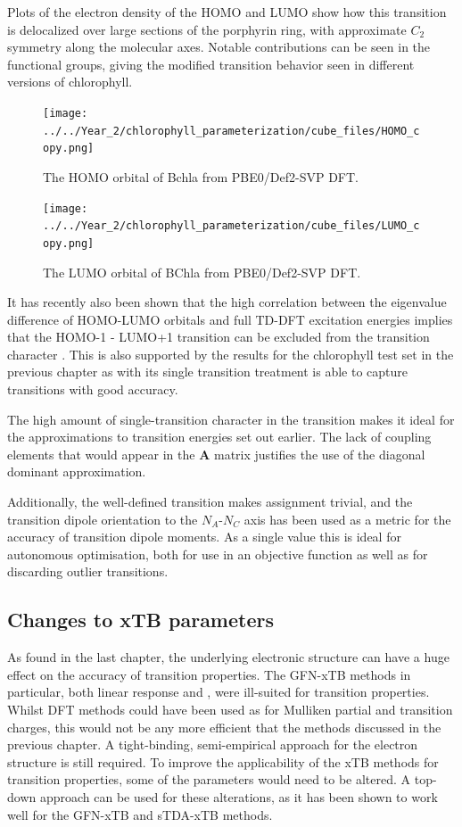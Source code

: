 Plots of the electron density of the HOMO and LUMO show how this transition is delocalized
over large sections of the porphyrin ring, with approximate $C_2$ symmetry along
the molecular axes. Notable contributions can be seen in the functional groups,
giving the modified transition behavior seen in different versions of chlorophyll.

\begin{figure}
    \centering
    \texttt{[image: ../../Year\_2/chlorophyll\_parameterization/cube\_files/HOMO\_copy.png]}
    \caption{The HOMO orbital of Bchla from PBE0/Def2-SVP DFT.}
    \label{fig:HOMO}
\end{figure}

\begin{figure}
    \centering
    \texttt{[image: ../../Year\_2/chlorophyll\_parameterization/cube\_files/LUMO\_copy.png]}
    \caption{The LUMO orbital of BChla from PBE0/Def2-SVP DFT.}
\end{figure}

It has recently also been shown that the high correlation between the eigenvalue
difference of HOMO-LUMO orbitals and full TD-DFT excitation energies implies that
the HOMO-1 - LUMO+1 transition can be excluded from the transition character \cite{Saito2020}.
This is also supported by the results for the chlorophyll test set in the previous
chapter as \dscf with its single transition treatment is able to capture \Qy transitions
with good accuracy.

The high amount of single-transition character in the \Qy transition makes it ideal
for the approximations to transition energies set out earlier. The lack of coupling
elements that would appear in the $\mathbf{A}$ matrix justifies the use of the diagonal
dominant approximation.

Additionally, the well-defined transition makes assignment trivial, and the transition
dipole orientation to the $N_A$-$N_C$ axis has been used as a metric for the accuracy
of transition dipole moments. As a single value this is ideal for autonomous optimisation,
both for use in an objective function as well as for discarding outlier transitions.

\subsection{Changes to xTB parameters}
\label{subsec:chl_method}

As found in the last chapter, the underlying electronic structure can have a huge
effect on the accuracy of transition properties. The GFN-xTB methods in particular,
both linear response and \dxtb, were ill-suited for transition properties. Whilst
DFT methods could have been used as for Mulliken partial and transition charges,
this would not be any more efficient that the \dscf methods discussed in the previous 
chapter. A tight-binding, semi-empirical approach for the electron structure is still 
required. To improve the applicability of the xTB methods for transition properties, 
some of the parameters would need to be altered. A top-down approach can be used 
for these alterations, as it has been shown to work well for the GFN-xTB and sTDA-xTB
methods. 

